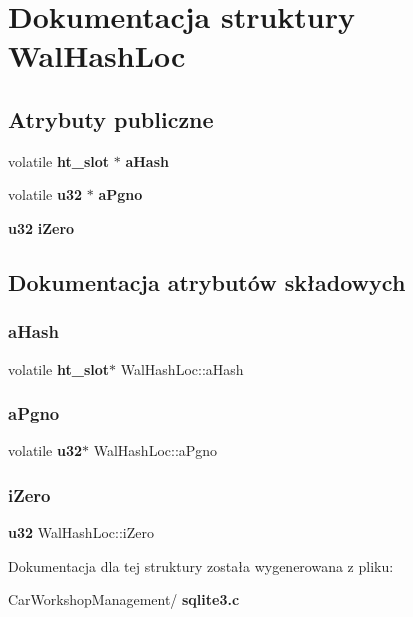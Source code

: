 \section{Dokumentacja struktury Wal\+Hash\+Loc}
\label{struct_wal_hash_loc}
\subsection*{Atrybuty publiczne}
\begin{DoxyCompactItemize}
\item 
volatile \textbf{ ht\+\_\+slot} $\ast$ \textbf{ a\+Hash}
\item 
volatile \textbf{ u32} $\ast$ \textbf{ a\+Pgno}
\item 
\textbf{ u32} \textbf{ i\+Zero}
\end{DoxyCompactItemize}


\subsection{Dokumentacja atrybutów składowych}
\mbox{\label{struct_wal_hash_loc_a4f1899d3132f8923c1a47c7459eb0157}} 
\subsubsection{aHash}
{\footnotesize\ttfamily volatile \textbf{ ht\+\_\+slot}$\ast$ Wal\+Hash\+Loc\+::a\+Hash}

\mbox{\label{struct_wal_hash_loc_a1b7931c6f79c267bc3b41057e6292366}} 
\subsubsection{aPgno}
{\footnotesize\ttfamily volatile \textbf{ u32}$\ast$ Wal\+Hash\+Loc\+::a\+Pgno}

\mbox{\label{struct_wal_hash_loc_a8ca52e2afd4c06e9a789f5c4e7db58d8}} 
\subsubsection{iZero}
{\footnotesize\ttfamily \textbf{ u32} Wal\+Hash\+Loc\+::i\+Zero}



Dokumentacja dla tej struktury została wygenerowana z pliku\+:\begin{DoxyCompactItemize}
\item 
Car\+Workshop\+Management/\textbf{ sqlite3.\+c}\end{DoxyCompactItemize}
